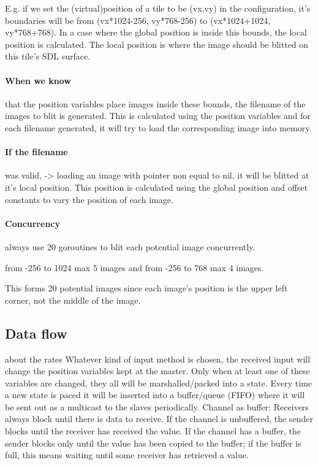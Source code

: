 \documentclass[12pt, a4paper, oneside]{article}
\begin{document}
E.g. if we set the (virtual)position of a tile to be (vx,vy) in the configuration, it's boundaries will be from (vx*1024-256, vy*768-256) to (vx*1024+1024, vy*768+768). In a case where the global position is inside this bounds, the local position is calculated. The local position is where the image should be blitted on this tile's SDL surface.

\paragraph{When we know}
that the position variables place images inside these bounds, the filename of the images to blit is generated. This is calculated using the position variables and for each filename generated, it will try to load the corresponding image into memory.

\paragraph{If the filename}
was valid, -> loading an image with pointer non equal to nil, it will be blitted at it's local position. This position is calculated using the global position and offset constants to vary the position of each image.

\paragraph{Concurrency} 
always use 20 goroutines to blit each potential image concurrently. 

from -256 to 1024 max 5 images and from -256 to 768 max 4 images. 

This forms 20 potential images since each image's position is the upper left corner, not the middle of the image.

\subsection{Data flow}
about the rates\newline
Whatever kind of input method is chosen, the received input will change the position variables kept at the master. Only when at least one of these variables are changed, they all will be marshalled/packed into a state. Every time a new state is paced it will be inserted into a buffer/queue (FIFO)  where it will be sent out as a multicast to the slaves periodically.
\newline
\newline
Channel as buffer:
Receivers always block until there is data to receive. If the channel is unbuffered, the sender blocks until the receiver has received the value. If the channel has a buffer, the sender blocks only until the value has been copied to the buffer; if the buffer is full, this means waiting until some receiver has retrieved a value.
\end{document}
